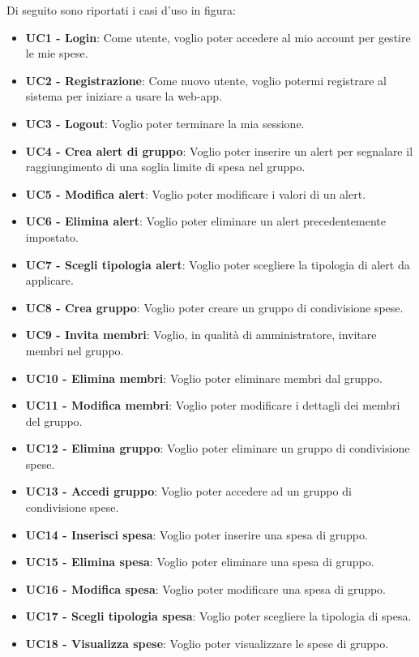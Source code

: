 Di seguito sono riportati i casi d'uso in figura:
\begin{itemize}
    \item \textbf{UC1 - Login}: Come utente, voglio poter accedere al mio account per gestire le mie spese.
    \item \textbf{UC2 - Registrazione}: Come nuovo utente, voglio potermi registrare al sistema per iniziare a usare la web-app.
    \item \textbf{UC3 - Logout}: Voglio poter terminare la mia sessione.
    \item \textbf{UC4 - Crea alert di gruppo}: Voglio poter inserire un alert per segnalare il raggiungimento di una soglia limite di spesa nel gruppo.
    \item \textbf{UC5 - Modifica alert}: Voglio poter modificare i valori di un alert.
    \item \textbf{UC6 - Elimina alert}: Voglio poter eliminare un alert precedentemente impostato.
    \item \textbf{UC7 - Scegli tipologia alert}: Voglio poter scegliere la tipologia di alert da applicare.
    \item \textbf{UC8 - Crea gruppo}: Voglio poter creare un gruppo di condivisione spese.
    \item \textbf{UC9 - Invita membri}: Voglio, in qualità di amministratore, invitare membri nel gruppo.
    \item \textbf{UC10 - Elimina membri}: Voglio poter eliminare membri dal gruppo.
    \item \textbf{UC11 - Modifica membri}: Voglio poter modificare i dettagli dei membri del gruppo.
    \item \textbf{UC12 - Elimina gruppo}: Voglio poter eliminare un gruppo di condivisione spese.
    \item \textbf{UC13 - Accedi gruppo}: Voglio poter accedere ad un gruppo di condivisione spese.
    \item \textbf{UC14 - Inserisci spesa}: Voglio poter inserire una spesa di gruppo.
    \item \textbf{UC15 - Elimina spesa}: Voglio poter eliminare una spesa di gruppo.
    \item \textbf{UC16 - Modifica spesa}: Voglio poter modificare una spesa di gruppo.
    \item \textbf{UC17 - Scegli tipologia spesa}: Voglio poter scegliere la tipologia di spesa.
    \item \textbf{UC18 - Visualizza spese}: Voglio poter visualizzare le spese di gruppo.

\end{itemize}
